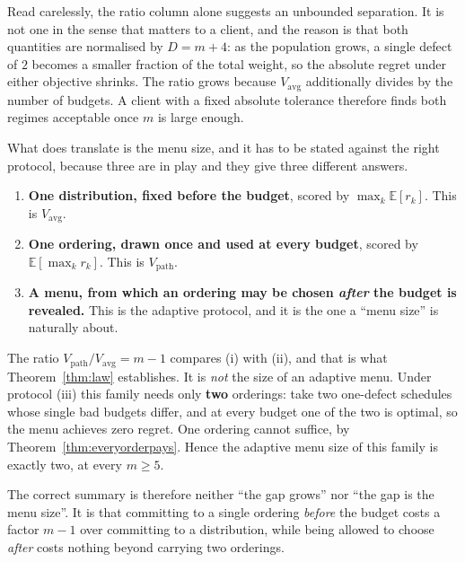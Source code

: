 Read carelessly, the ratio column alone suggests an unbounded separation. It is not one in
the sense that matters to a client, and the reason is that both quantities are normalised by
$D=m+4$: as the population grows, a single defect of $2$ becomes a smaller fraction of the
total weight, so the absolute regret under either objective shrinks. The ratio grows because
$V_{\mathrm{avg}}$ additionally divides by the number of budgets. A client with a fixed
absolute tolerance therefore finds both regimes acceptable once $m$ is large enough.

What does translate is the menu size, and it has to be stated against the right protocol,
because three are in play and they give three different answers.

\begin{enumerate}
\item[(i)] \textbf{One distribution, fixed before the budget}, scored by
$\max_{k}\mathbb{E}[r_{k}]$. This is $V_{\mathrm{avg}}$.
\item[(ii)] \textbf{One ordering, drawn once and used at every budget}, scored by
$\mathbb{E}[\max_{k}r_{k}]$. This is $V_{\mathrm{path}}$.
\item[(iii)] \textbf{A menu, from which an ordering may be chosen \emph{after} the budget is
revealed.} This is the adaptive protocol, and it is the one a ``menu size'' is naturally about.
\end{enumerate}

The ratio $V_{\mathrm{path}}/V_{\mathrm{avg}}=m-1$ compares (i) with (ii), and that is what
Theorem~\ref{thm:law} establishes. It is \emph{not} the size of an adaptive menu. Under
protocol (iii) this family needs only \textbf{two} orderings: take two one-defect schedules
whose single bad budgets differ, and at every budget one of the two is optimal, so the menu
achieves zero regret. One ordering cannot suffice, by Theorem~\ref{thm:everyorderpays}. Hence
the adaptive menu size of this family is exactly two, at every $m\ge5$.


The correct summary is therefore neither ``the gap grows'' nor ``the gap is the menu size''.
It is that committing to a single ordering \emph{before} the budget costs a factor $m-1$ over
committing to a distribution, while being allowed to choose \emph{after} costs nothing beyond
carrying two orderings.

